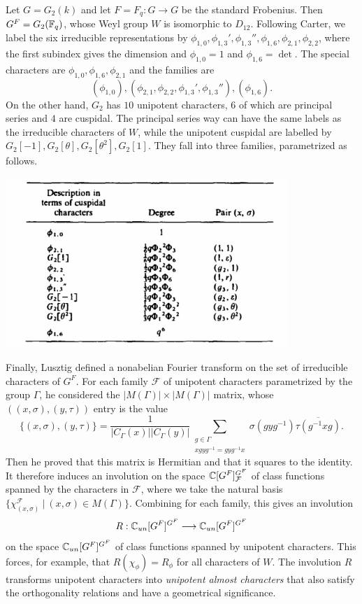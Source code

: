 \begin{example}
    Let $G=G_2(k)$ and let $F=F_q:G\to G$ be the standard Frobenius. Then $G^F=G_2(\mathbb{F}_q)$, whose Weyl group $W$ is isomorphic to $D_{12}$. Following Carter, we label the six irreducible representations by $\phi_{1,0},\phi_{1,3}',\phi_{1,3}'',\phi_{1,6},\phi_{2,1},\phi_{2,2}$, where the first subindex gives the dimension and $\phi_{1,0}=1$ and $\phi_{1,6}=\det$. The special characters are $\phi_{1,0},\phi_{1,6},\phi_{2,1}$ and the families are 
    $$(\phi_{1,0}),(\phi_{2,1},\phi_{2,2},\phi_{1,3}',\phi_{1,3}''),(\phi_{1,6}).$$
    On the other hand, $G_2$ has $10$ unipotent characters, $6$ of which are principal series and $4$ are cuspidal. The principal series way can have the same labels as the irreducible characters of $W$, while the unipotent cuspidal are labelled by $G_2[-1],G_2[\theta],G_2[\theta^2],G_2[1]$. They fall into three families, parametrized as follows. 
    \begin{center}
        \includegraphics[width=0.8\textwidth]{cuspidals G_2.png}
    \end{center}
\end{example}

Finally, Lusztig defined a nonabelian Fourier transform on the set of irreducible characters of $G^F$. For each family $\mathcal{F}$ of unipotent characters parametrized by the group $\Gamma$, he considered the $|M(\Gamma)|\times|M(\Gamma)|$ matrix, whose $((x,\sigma),(y,\tau))$ entry is the value 
$$\{(x,\sigma),(y,\tau)\}=\frac{1}{|C_\Gamma(x)||C_\Gamma(y)|}\sum_{\substack{g\in \Gamma\\ xgyg^{-1}=gyg^{-1}x}}\sigma(gyg^{-1})\overline{\tau(g^{-1}xg)}.$$
Then he proved that this matrix is Hermitian and that it squares to the identity. It therefore induces an involution on the space $\mathbb{C}[G^F]^{G^F}_\mathcal{F}$ of class functions spanned by the characters in $\mathcal{F}$, where we take the natural basis $\{\chi_{(x,\sigma)}^\mathcal{F}\ |\ (x,\sigma)\in M(\Gamma)\}$. Combining for each family, this gives an involution 
$$R:\mathbb{C}_{un}[G^F]^{G^F}\longrightarrow \mathbb{C}_{un}[G^F]^{G^F}$$
on the space $\mathbb{C}_{un}[G^F]^{G^F}$ of class functions spanned by unipotent characters. This forces, for example, that $R(\chi_\phi)=R_\phi$ for all characters of $W$. The involution $R$ transforms unipotent characters into \textit{unipotent almost characters} that also satisfy the orthogonality relations and have a geometrical significance.

